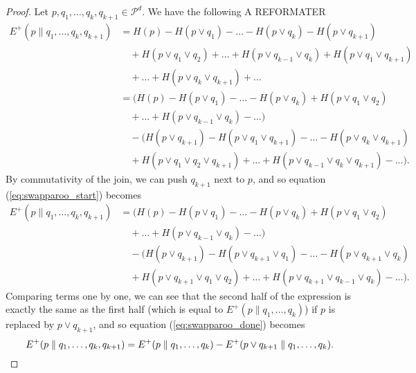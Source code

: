 \begin{proof}
    Let $p, q_1, \dots, q_k, q_{k+1} \in \mathcal{P}^d$. We have the following A REFORMATER
    \begin{align}
        E^+(p \parallel q_1, \dots, q_k, q_{k+1}) &= H(p) - H(p \vee q_1) - \dots - H(p \vee q_k) - H(p \vee q_{k+1}) \nonumber \\
                                                  &\quad + H(p \vee q_1 \vee q_2) + \dots + H(p \vee q_{k-1} \vee q_k) + H(p \vee q_1 \vee q_{k+1}) \nonumber \\
                                                  &\quad + \dots + H(p \vee q_k \vee q_{k+1}) + \dots\\
                                                  &= \big(H(p) - H(p \vee q_1) - \dots - H(p \vee q_k) + H(p \vee q_1 \vee q_2)\nonumber \\
                                                  &\quad + \dots + H(p \vee q_{k-1} \vee q_k) - \dots \big) \nonumber \\
                                                  &\quad - \big(H(p \vee q_{k+1}) - H(p \vee q_1 \vee q_{k+1}) - \dots - H(p \vee q_k \vee q_{k+1})\nonumber \\
                                                  &\quad + H(p \vee q_1 \vee q_2 \vee q_{k+1}) + \dots + H(p \vee q_{k-1} \vee q_k \vee q_{k+1}) - \dots\big). \label{eq:swapparoo_start}
    \end{align}
    By commutativity of the join, we can push $q_{k+1}$ next to $p$, and so equation (\ref{eq:swapparoo_start}) becomes
    \begin{align}
        E^+(p \parallel q_1, \dots, q_k, q_{k+1}) &= \big(H(p) - H(p \vee q_1) - \dots - H(p \vee q_k) + H(p \vee q_1 \vee q_2)\nonumber \\
                                                  &\quad + \dots + H(p \vee q_{k-1} \vee q_k) - \dots \big) \nonumber \\
                                                  &\quad - \big(H(p \vee q_{k+1}) - H(p \vee q_{k+1} \vee q_1 ) - \dots - H(p \vee q_{k+1} \vee q_k )\nonumber \\
                                                  &\quad + H(p \vee q_{k+1} \vee q_1 \vee q_2 ) + \dots + H(p\vee q_{k+1} \vee q_{k-1} \vee q_k) - \dots\big). \label{eq:swapparoo_done}
    \end{align}
    Comparing terms one by one, we can see that the second half of the expression is exactly the same as the first half (which is equal to $E^+(p \parallel q_1, \dots, q_k)$) if $p$ is replaced by $p \vee q_{k+1}$, and so equation (\ref{eq:swapparoo_done}) becomes
    \begin{equation}
        E^+(p \parallel q_1, \dots, q_k, q_{k+1}) = E^+(p \parallel q_1, \dots, q_k) - E^+(p \vee q_{k+1} \parallel q_1, \dots, q_k). \qedhere
    \end{equation}
\end{proof}

